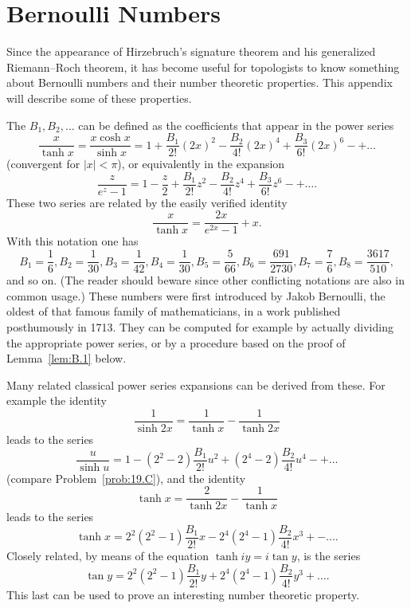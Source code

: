 \documentclass[../main]{subfiles}
\begin{document}
\chapter{Bernoulli Numbers}\label{app:B}
Since the appearance of Hirzebruch's signature theorem and his generalized Riemann--Roch theorem, it has become useful for topologists to know something about Bernoulli numbers and their number theoretic properties. This appendix will describe some of these properties.

The  $B_1, B_2, \ldots$ can be defined as the coefficients that appear in the power series \[\frac x {\tanh x} = \frac {x \cosh x} {\sinh x} = 1 + \frac {B_1} {2!} (2x)^2 - \frac {B_2} {4!} (2x)^4 + \frac {B_3} {6!} (2x)^6 - + \ldots\] (convergent for $|x| < \pi$), or equivalently in the expansion \[\frac z {e^z - 1} = 1 - \frac z 2 + \frac {B_1} {2!} z^2 - \frac {B_2} {4!} z^4 + \frac {B_3} {6!} z^6 - + \ldots.\] These two series are related by the easily verified identity \[\frac x {\tanh x} = \frac {2 x} {e^{2x} - 1} + x.\] With this notation one has \[B_1 = \frac 1 6, B_2 = \frac 1 {30}, B_3 = \frac 1 {42}, B_4 = \frac 1 {30}, B_5 = \frac 5 {66}, B_6 = \frac {691} {2730}, B_7 = \frac 7 6, B_8 = \frac {3617} {510},\] and so on. (The reader should beware since other conflicting notations are also in common usage.) These numbers were first introduced by Jakob Bernoulli, the oldest of that famous family of mathematicians, in a work published posthumously in 1713. They can be computed for example by actually dividing the appropriate power series, or by a procedure based on the proof of Lemma~\ref{lem:B.1} below.

Many related classical power series expansions can be derived from these. For example the identity \[\frac 1 {\sinh 2 x} = \frac 1 {\tanh x} - \frac 1 {\tanh 2 x}\] leads to the series \[\frac u {\sinh u} = 1 - (2^2 - 2) \frac {B_1} {2!} u^2 + (2^4 - 2) \frac {B_2} {4!} u^4 - + \ldots\] (compare Problem~\ref{prob:19.C}), and the identity \[\tanh x = \frac 2 {\tanh 2 x} - \frac 1 {\tanh x}\] leads to the series \[\tanh x = 2^2(2^2 - 1) \frac {B_1} {2!} x - 2^4(2^4 - 1) \frac {B_2} {4!} x^3 + - \ldots .\] Closely related, by means of the equation $\tanh i y = i \tan y$, is the series \[\tan y = 2^2(2^2 - 1) \frac {B_1} {2!} y + 2^4(2^4 - 1) \frac {B_2} {4!} y^3 + \ldots.\] This last can be used to prove an interesting number theoretic property.
\end{document}
